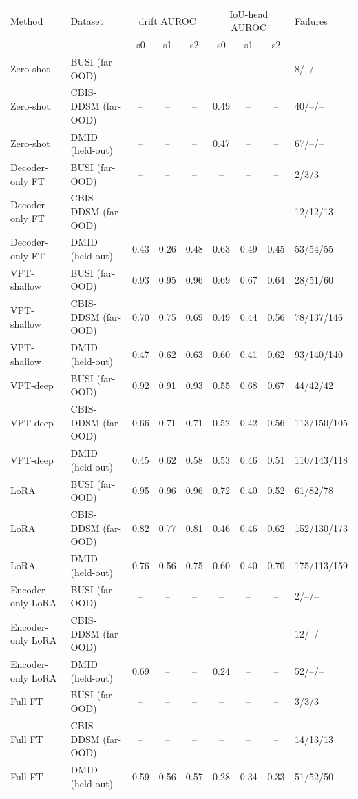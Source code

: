\begin{tabular}{llccccccl}
\toprule
Method & Dataset & \multicolumn{3}{c}{drift AUROC} & \multicolumn{3}{c}{IoU-head AUROC} & Failures \\
 & & s0 & s1 & s2 & s0 & s1 & s2 & \\
\midrule
Zero-shot & BUSI (far-OOD) & -- & -- & -- & -- & -- & -- & 8/--/-- \\
Zero-shot & CBIS-DDSM (far-OOD) & -- & -- & -- & 0.49 & -- & -- & 40/--/-- \\
Zero-shot & DMID (held-out) & -- & -- & -- & 0.47 & -- & -- & 67/--/-- \\
Decoder-only FT & BUSI (far-OOD) & -- & -- & -- & -- & -- & -- & 2/3/3 \\
Decoder-only FT & CBIS-DDSM (far-OOD) & -- & -- & -- & -- & -- & -- & 12/12/13 \\
Decoder-only FT & DMID (held-out) & 0.43 & 0.26 & 0.48 & 0.63 & 0.49 & 0.45 & 53/54/55 \\
VPT-shallow & BUSI (far-OOD) & 0.93 & 0.95 & 0.96 & 0.69 & 0.67 & 0.64 & 28/51/60 \\
VPT-shallow & CBIS-DDSM (far-OOD) & 0.70 & 0.75 & 0.69 & 0.49 & 0.44 & 0.56 & 78/137/146 \\
VPT-shallow & DMID (held-out) & 0.47 & 0.62 & 0.63 & 0.60 & 0.41 & 0.62 & 93/140/140 \\
VPT-deep & BUSI (far-OOD) & 0.92 & 0.91 & 0.93 & 0.55 & 0.68 & 0.67 & 44/42/42 \\
VPT-deep & CBIS-DDSM (far-OOD) & 0.66 & 0.71 & 0.71 & 0.52 & 0.42 & 0.56 & 113/150/105 \\
VPT-deep & DMID (held-out) & 0.45 & 0.62 & 0.58 & 0.53 & 0.46 & 0.51 & 110/143/118 \\
LoRA & BUSI (far-OOD) & 0.95 & 0.96 & 0.96 & 0.72 & 0.40 & 0.52 & 61/82/78 \\
LoRA & CBIS-DDSM (far-OOD) & 0.82 & 0.77 & 0.81 & 0.46 & 0.46 & 0.62 & 152/130/173 \\
LoRA & DMID (held-out) & 0.76 & 0.56 & 0.75 & 0.60 & 0.40 & 0.70 & 175/113/159 \\
Encoder-only LoRA & BUSI (far-OOD) & -- & -- & -- & -- & -- & -- & 2/--/-- \\
Encoder-only LoRA & CBIS-DDSM (far-OOD) & -- & -- & -- & -- & -- & -- & 12/--/-- \\
Encoder-only LoRA & DMID (held-out) & 0.69 & -- & -- & 0.24 & -- & -- & 52/--/-- \\
Full FT & BUSI (far-OOD) & -- & -- & -- & -- & -- & -- & 3/3/3 \\
Full FT & CBIS-DDSM (far-OOD) & -- & -- & -- & -- & -- & -- & 14/13/13 \\
Full FT & DMID (held-out) & 0.59 & 0.56 & 0.57 & 0.28 & 0.34 & 0.33 & 51/52/50 \\
\bottomrule
\end{tabular}
